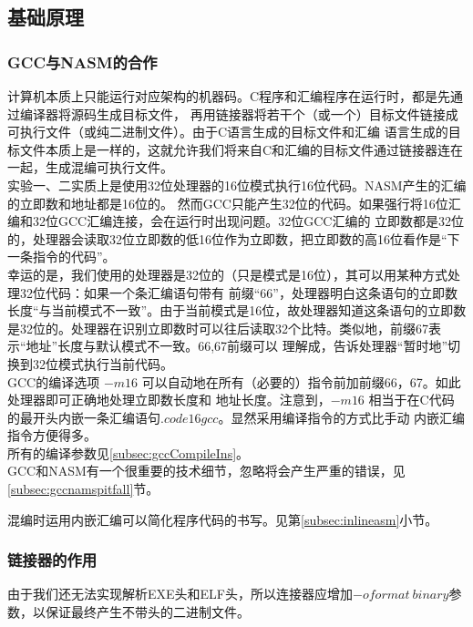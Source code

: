 \documentclass[a4paper]{article}
\begin{document}
    \subsection{基础原理}
    \subsubsection{GCC与NASM的合作}\label{subsec:GccNasmHybrid}
    计算机本质上只能运行对应架构的机器码。C程序和汇编程序在运行时，都是先通过编译器将源码生成目标文件，
    再用链接器将若干个（或一个）目标文件链接成可执行文件（或纯二进制文件）。由于C语言生成的目标文件和汇编
    语言生成的目标文件本质上是一样的，这就允许我们将来自C和汇编的目标文件通过链接器连在一起，生成混编可执行文件。\\
    
    实验一、二实质上是使用32位处理器的16位模式执行16位代码。NASM产生的汇编的立即数和地址都是16位的。
    然而GCC只能产生32位的代码。如果强行将16位汇编和32位GCC汇编连接，会在运行时出现问题。32位GCC汇编的
    立即数都是32位的，处理器会读取32位立即数的低16位作为立即数，把立即数的高16位看作是``下一条指令的代码''。\\

    幸运的是，我们使用的处理器是32位的（只是模式是16位），其可以用某种方式处理32位代码：如果一个条汇编语句带有
    前缀``66''，处理器明白这条语句的立即数长度``与当前模式不一致''。由于当前模式是16位，故处理器知道这条语句的立即数
    是32位的。处理器在识别立即数时可以往后读取32个比特。类似地，前缀67表示``地址''长度与默认模式不一致。66,67前缀可以
    理解成，告诉处理器``暂时地''切换到32位模式执行当前代码。 \\

    GCC的编译选项 $-m16$ 可以自动地在所有（必要的）指令前加前缀66，67。如此处理器即可正确地处理立即数长度和
    地址长度。注意到，$-m16 $ 相当于在C代码的最开头内嵌一条汇编语句$.code16gcc$。显然采用编译指令的方式比手动
    内嵌汇编指令方便得多。\\
    
    所有的编译参数见\ref{subsec:gccCompileIns}。 \\
    
    GCC和NASM有一个很重要的技术细节，忽略将会产生严重的错误，见\ref{subsec:gccnamspitfall}节。
   
    混编时运用内嵌汇编可以简化程序代码的书写。见第\ref{subsec:inlineasm}小节。
    \subsubsection{链接器的作用}
    由于我们还无法实现解析EXE头和ELF头，所以连接器应增加$-oformat \  binary$参数，以保证最终产生不带头的二进制文件。\\
    
\end{document}
